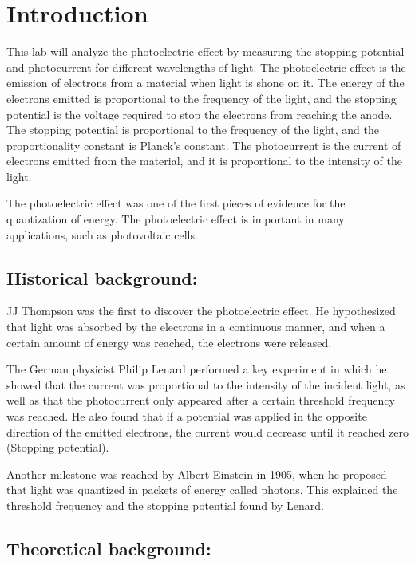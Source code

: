 \section{Introduction}

This lab will analyze the photoelectric effect by measuring the stopping potential and photocurrent for different wavelengths of light. The photoelectric effect is the emission of electrons from a material when light is shone on it. The energy of the electrons emitted is proportional to the frequency of the light, and the stopping potential is the voltage required to stop the electrons from reaching the anode. The stopping potential is proportional to the frequency of the light, and the proportionality constant is Planck's constant. The photocurrent is the current of electrons emitted from the material, and it is proportional to the intensity of the light.

The photoelectric effect was one of the first pieces of evidence for the quantization of energy. The photoelectric effect is important in many applications, such as photovoltaic cells.

\subsection{Historical background:}

JJ Thompson was the first to discover the photoelectric effect. He hypothesized that light was absorbed by the electrons in a continuous manner, and when a certain amount of
energy was reached, the electrons were released.

The German physicist Philip Lenard performed a key experiment in which he showed that the current was proportional to the intensity of the incident light, as well as that the photocurrent
only appeared after a certain threshold frequency was reached. He also found that if a potential was applied in the opposite direction of the emitted electrons, the current would decrease until it reached zero (Stopping potential).

Another milestone was reached by Albert Einstein in 1905, when he proposed that light was quantized in packets of energy called photons. This explained the threshold frequency and the stopping potential found by Lenard.

\subsection{Theoretical background:}

